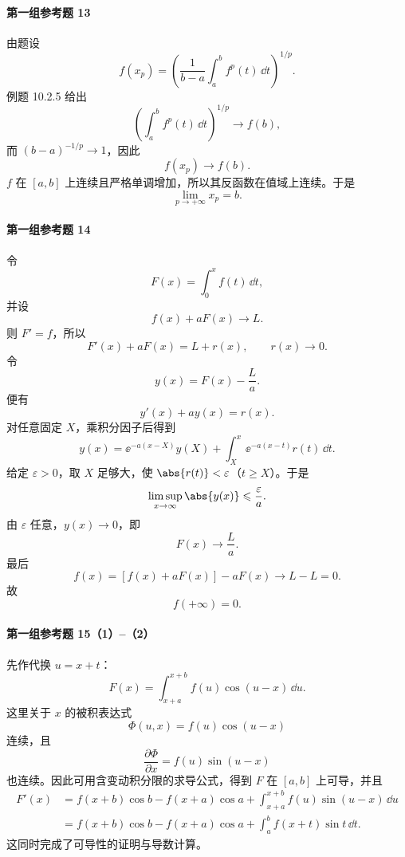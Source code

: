 \paragraph{第一组参考题 13}
\begin{xsolution}
由题设
\[
  f(x_p)=
  \left(\frac1{b-a}\int_a^b f^p(t)\,\dd t\right)^{1/p}.
\]
例题 10.2.5 给出
\[
  \left(\int_a^b f^p(t)\,\dd t\right)^{1/p}\to f(b),
\]
而 $(b-a)^{-1/p}\to1$，因此
\[
  f(x_p)\to f(b).
\]
$f$ 在 $[a,b]$ 上连续且严格单调增加，所以其反函数在值域上连续。于是
\[
  \boxed{\lim_{p\to+\infty}x_p=b}.
\]
\end{xsolution}

\paragraph{第一组参考题 14}
\begin{xsolution}
令
\[
  F(x)=\int_0^x f(t)\,\dd t,
\]
并设
\[
  f(x)+aF(x)\to L.
\]
则 $F'=f$，所以
\[
  F'(x)+aF(x)=L+r(x),
  \qquad r(x)\to0.
\]
令
\[
  y(x)=F(x)-\frac La.
\]
便有
\[
  y'(x)+ay(x)=r(x).
\]
对任意固定 $X$，乘积分因子后得到
\[
  y(x)=\ee^{-a(x-X)}y(X)
  +\int_X^x\ee^{-a(x-t)}r(t)\,\dd t.
\]
给定 $\varepsilon>0$，取 $X$ 足够大，使 $\abs{r(t)}<\varepsilon$（$t\geqslant X$）。于是
\[
  \limsup_{x\to\infty}\abs{y(x)}\leqslant\frac\varepsilon a.
\]
由 $\varepsilon$ 任意，$y(x)\to0$，即
\[
  F(x)\to\frac La.
\]
最后
\[
  f(x)=[f(x)+aF(x)]-aF(x)\to L-L=0.
\]
故
\[
  \boxed{f(+\infty)=0}.
\]
\end{xsolution}

\paragraph{第一组参考题 15（1）--（2）}
\begin{xsolution}
先作代换 $u=x+t$：
\[
  F(x)=\int_{x+a}^{x+b}f(u)\cos(u-x)\,\dd u.
\]
这里关于 $x$ 的被积表达式
\[
  \Phi(u,x)=f(u)\cos(u-x)
\]
连续，且
\[
  \frac{\partial\Phi}{\partial x}=f(u)\sin(u-x)
\]
也连续。因此可用含变动积分限的求导公式，得到 $F$ 在 $[a,b]$ 上可导，并且
\begin{align*}
  F'(x)
  &=f(x+b)\cos b-f(x+a)\cos a
  +\int_{x+a}^{x+b}f(u)\sin(u-x)\,\dd u\\
  &=\boxed{f(x+b)\cos b-f(x+a)\cos a
  +\int_a^b f(x+t)\sin t\,\dd t}.
\end{align*}
这同时完成了可导性的证明与导数计算。
\end{xsolution}

